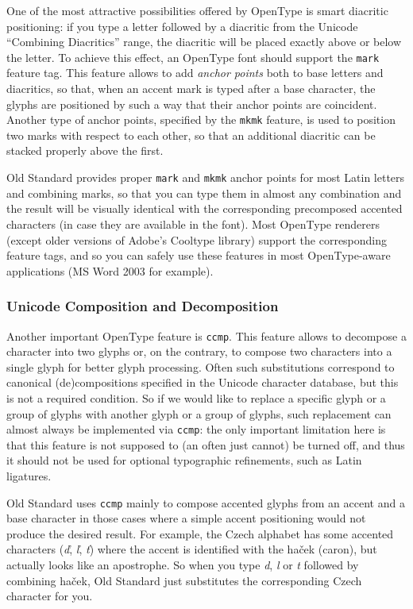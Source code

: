 \documentclass[12pt,a4paper,openany]{book}
\begin{document}
One of the most attractive possibilities offered by OpenType is smart
diacritic positioning: if you type a letter followed by a diacritic from
the Unicode “Combining Diacritics” range, the diacritic will be placed
exactly above or below the letter. To achieve this effect, an OpenType
font should support the \texttt{mark} feature tag. This feature allows to
add \textit{anchor points} both to base letters and diacritics, so that,
when an accent mark is typed after a base character, the glyphs are
positioned by such a way that their anchor points are coincident. Another
type of anchor points, specified by the \texttt{mkmk} feature, is used to
position two marks with respect to each other, so that an additional
diacritic can be stacked properly above the first. 

Old Standard provides proper \texttt{mark} and \texttt{mkmk} anchor points
for most Latin letters and combining marks, so that you can type them in
almost any combination and the result will be visually identical with the
corresponding precomposed accented characters (in case they are available
in the font). Most OpenType renderers (except older versions of Adobe’s 
Cooltype library) support the corresponding feature tags, and so you can
safely use these features in most OpenType-aware applications (MS Word 2003
for example).

\subsubsection{Unicode Composition and Decomposition}
\hypertarget{ccmp}{}

Another important OpenType feature is \texttt{ccmp}. This feature allows
to decompose a character into two glyphs or, on the contrary, to compose
two characters into a single glyph for better glyph processing. Often such
substitutions correspond to canonical (de)compositions specified in the
Unicode character database, but this is not a required condition. So if we
would like to replace a specific glyph or a group of glyphs with another
glyph or a group of glyphs, such replacement can almost always be
implemented via \texttt{ccmp}: the only important limitation here is that
this feature is not supposed to (an often just cannot) be turned off, and
thus it should not be used for optional typographic refinements, such as
Latin ligatures.

Old Standard uses \texttt{ccmp} mainly to compose accented glyphs from an
accent and a base character in those cases where a simple accent positioning
would not produce the desired result. For example, the Czech alphabet has
some accented characters (\textit{ď}, \textit{ľ}, \textit{ť}) where the
accent is identified with the haček (caron), but actually looks like an
apostrophe. So when you type \textit{d}, \textit{l} or \textit{t} followed
by combining haček, Old Standard just substitutes the corresponding Czech
character for you.
\end{document}
